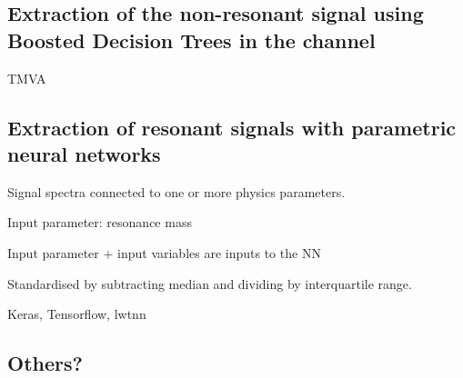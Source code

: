\subsection{Extraction of the non-resonant signal using Boosted
  Decision Trees in the \hadhad channel}
\label{sec:mva_smbdt}



TMVA



\subsection{Extraction of resonant signals with parametric neural networks}
\label{sec:mva_pnn}

Signal spectra connected to one or more physics parameters.

Input parameter: resonance mass \mX

Input parameter + input variables are inputs to the NN

Standardised by subtracting median and dividing by interquartile range.

Keras, Tensorflow, lwtnn




\subsection{Others?}



